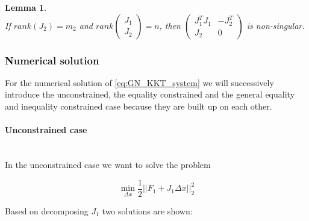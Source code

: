 \documentclass{scrartcl}[12pt, halfparskip]
\newtheorem{Lemma}{Lemma}
\begin{document}
\begin{Lemma} \textcolor{white}{.}\\
	If $rank(J_2) = m_2$ and $rank 
	\begin{pmatrix}
	J_1 \\
	J_2
	\end{pmatrix}
	= n$,
	then 	
	$\begin{pmatrix}
		J_1^T J_1 & -J_2^T \\
		J_2 & 0
	\end{pmatrix}$
	is non-singular.
\end{Lemma}

\subsubsection{Numerical solution}
For the numerical solution of \eqref{eq:GN_KKT_system} we will successively introduce the unconstrained, the equality constrained and the general equality and inequality constrained case because they are built up on each other.

\paragraph{Unconstrained case}\mbox{}\\
In the unconstrained case we want to solve the problem

\begin{equation}
\min_{\Delta x} \frac{1}{2} || F_1 + J_1 \Delta x ||_2^2
\label{eq:numerical_solution_LSQ}
\end{equation}

Based on decomposing $J_1$ two solutions are shown:
\end{document}
